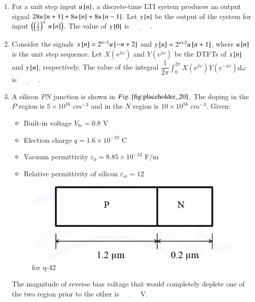 \documentclass[journal,12pt,onecolumn]{IEEEtran}
\theoremstyle{remark}
\begin{document}
\begin{enumerate}
\hfill {}

\item For a unit step input $u{}\left[n\right]$, a discrete-time LTI system produces an output signal $28 u{}\left[n+1\right] + 8 u{}\left[n\right] + 8 u{}\left[n-1\right]$. Let $y{}\left[n\right]$ be the output of the system for input $\brak{\brak{\frac{1}{2}}^n  \ u\sbrak{n}}$. The value of $y{}\left[0\right]$ is  $\underline{\hspace{1cm}}$ .

\hfill {}

\item Consider the signals $x{}\left[n\right] = 2^{n-1} u{}\left[-n+2\right]$ and $y{}\left[n\right] = 2^{n+2} u{}\left[n+1\right]$, where $u{}\left[n\right]$ is the unit step sequence. Let $X(e^{j\omega})$ and $Y(e^{j\omega})$ be the DTFTs of $x{}\left[n\right]$ and $y{}\left[n\right]$, respectively.  
The value of the integral $\dfrac{1}{2\pi} \int_0^{2\pi} X(e^{j\omega}) Y(e^{-j\omega}) d\omega$  is  $\underline{\hspace{1cm}}$ .

\hfill {}

\item A silicon $PN$ junction is shown in $\figref{fig:placeholder_20}$. The doping in the $P$ region is $5 \times 10^{16}$ $cm^{-3}$ and in the $N$ region is $10 \times 10^{16}$ $cm^{-3}$.  
Given:  
\begin{itemize}
    \item Built-in voltage $V_{bi} = 0.8$ V
    \item Electron charge $q = 1.6 \times 10^{-19}$ C 
    \item Vacuum permittivity $\varepsilon_0 = 8.85 \times 10^{-12}$ F/m  
    \item Relative permittivity of silicon $\varepsilon_{si} = 12$  
\end{itemize}
\begin{figure}[H]
    \centering
    \includegraphics[width=0.4\columnwidth]{figs/20.png}
    \caption{\centering for q-42}
    \label{fig:placeholder_20}
\end{figure}

The magnitude of reverse bias voltage that would completely deplete one of the two region  prior to the other  is  $\underline{\hspace{1cm}}$ V.  


\end{enumerate}
\end{document}

